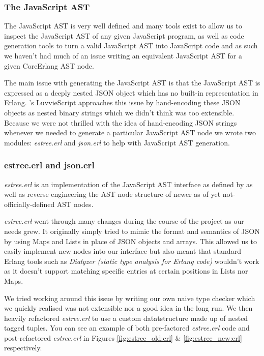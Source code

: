 \documentclass[twoside,12pt,titlepage,a4paper]{article}
\begin{document}
\subsubsection{The JavaScript AST}
The JavaScript AST is very well defined and many tools exist to allow us to inspect the JavaScript AST of any given JavaScript program, as well as code generation tools to turn a valid JavaScript AST into JavaScript code and as such we haven't had much of an issue writing an equivalent JavaScript AST for a given CoreErlang AST node.

The main issue with generating the JavaScript AST is that the JavaScript AST is expressed as a deeply nested JSON object which has no built-in representation in Erlang. \cite{luvvieGitHub}'s LuvvieScript approaches this issue by hand-encoding these JSON objects as nested binary strings which we didn't think was too extensible. Because we were not thrilled with the idea of hand-encoding JSON strings whenever we needed to generate a particular JavaScript AST node we wrote two modules: \textit{estree.erl} and \textit{json.erl} to help with JavaScript AST generation.

\subsubsection{estree.erl and json.erl}
\textit{estree.erl} is an implementation of the JavaScript AST interface as defined by \citeauthor{EStreeMDN} as well as reverse engineering the AST node structure of newer as of yet not-officially-defined AST nodes.

\textit{estree.erl} went through many changes during the course of the project as our needs grew. It originally simply tried to mimic the format and semantics of JSON by using Maps and Lists in place of JSON objects and arrays. This allowed us to easily implement new nodes into our interface but also meant that standard Erlang tools such as \textit{Dialyzer (static type analysis for Erlang code)} wouldn't work as it doesn't support matching specific entries at certain positions in Lists nor Maps. 

We tried working around this issue by writing our own naive type checker which we quickly realised was not extensible nor a good idea in the long run. We then heavily refactored \textit{estree.erl} to use a custom datatstructure made up of nested tagged tuples. You can see an example of both pre-factored \textit{estree.erl} code and post-refactored \textit{estree.erl} in Figures \ref{fig:estree_old:erl} \& \ref{fig:estree_new:erl} respectively.
\end{document}
